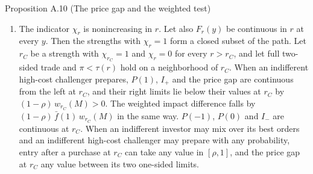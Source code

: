 \begin{paperresult}{Proposition A.10 (The price gap and the weighted test)}
\begin{enumerate}[label=(\roman*),leftmargin=2em]
\begin{enumerate}[label=(\alph*),leftmargin=2em]
\item The indicator \(\chi_r\) is nonincreasing in \(r\). Let also \(F_r(y)\) be continuous in \(r\) at every \(y\). Then the strengths with \(\chi_r=1\) form a closed subset of the path. Let \(r_C\) be a strength with \(\chi_{r_C}=1\) and \(\chi_r=0\) for every \(r>r_C\), and let full two-sided trade and \(\pi<\tau(r)\) hold on a neighborhood of \(r_C\). When an indifferent high-cost challenger prepares, \(P(1)\), \(I_+\) and the price gap are continuous from the left at \(r_C\), and their right limits lie below their values at \(r_C\) by \((1-\rho)\,w_{r_C}(M)>0\). The weighted impact difference falls by \((1-\rho)\,\bar f(1)\,w_{r_C}(M)\) in the same way. \(P(-1)\), \(P(0)\) and \(I_-\) are continuous at \(r_C\). When an indifferent investor may mix over its best orders and an indifferent high-cost challenger may prepare with any probability, entry after a purchase at \(r_C\) can take any value in \([\rho,1]\), and the price gap at \(r_C\) any value between its two one-sided limits.
\end{enumerate}
\end{enumerate}
\end{paperresult}

